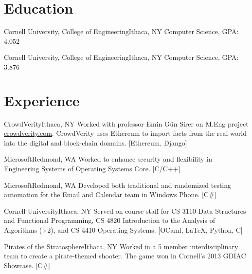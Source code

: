 \documentclass[11pt,letterpaper,sans]{moderncv}
\begin{document}
\makecvtitle

\section{Education}

{Cornell University, \mdseries College of Engineering}{Ithaca, NY}
{Computer Science, \textup{GPA: 4.052}}
{}
\medskip

{Cornell University, \mdseries College of Engineering}{Ithaca, NY}
{Computer Science, \textup{GPA: 3.876}}
{}
\medskip


\section{Experience}

{CrowdVerity}{Ithaca, NY}
{}
{Worked with professor Emin G\"{u}n Sirer on M.Eng project \url{crowdverity.com}. CrowdVerity uses Ethereum to import facts from the real-world into the digital and block-chain domains. [Ethereum, Django]}
\medskip

{Microsoft}{Redmond, WA}
{}
{Worked to enhance security and flexibility in Engineering Systems of Operating Systems Core. [C/C++]}
\medskip

{Microsoft}{Redmond, WA}
{}
{Developed both traditional and randomized testing automation for the Email and Calendar team in Windows Phone. [C\#]}
\medskip

{Cornell University}{Ithaca, NY}
{}
{Served on course staff for CS 3110 Data Structures and Functional Programming, CS 4820 Introduction to the Analysis of Algorithms ($\times$2), and CS 4410 Operating Systems. [OCaml, \LaTeX, Python, C]}
\medskip

{Pirates of the Stratosphere}{Ithaca, NY}
{}
{Worked in a 5 member interdisciplinary team to create a pirate-themed shooter. The game won in Cornell's 2013 GDIAC Showcase. [C\#]}
\medskip

\end{document}
